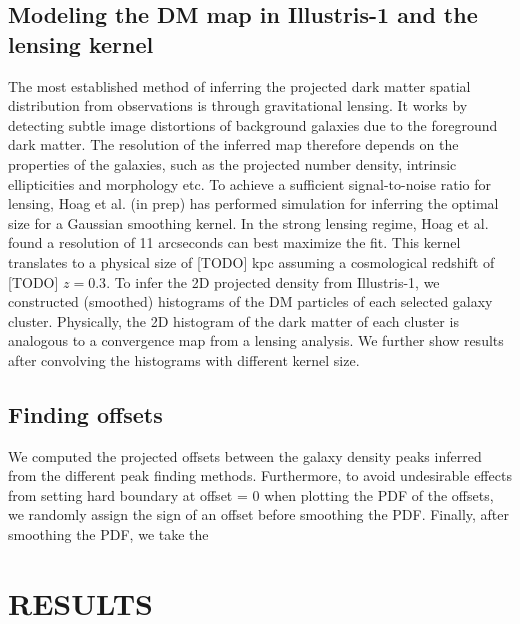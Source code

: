 \subsection{Modeling the DM map in Illustris-1 and the lensing kernel}
The most established method of inferring the projected dark matter spatial 
distribution from observations is through gravitational lensing.
It works by detecting subtle image distortions of background galaxies due to
the foreground dark matter. The resolution of the inferred map therefore 
depends on the properties of the galaxies, such as the projected number density, 
intrinsic ellipticities and morphology etc.
To achieve a sufficient signal-to-noise ratio for lensing, 
Hoag et al. (in prep) has performed simulation for inferring the optimal size
for a Gaussian smoothing kernel. 
In the strong lensing regime, Hoag et al. found a resolution of 11 arcseconds
can best maximize the fit. This kernel translates to a physical size of [TODO]
kpc assuming a cosmological redshift of [TODO] $z = 0.3$.
To infer the 2D projected density from Illustris-1, 
we constructed (smoothed) histograms of the DM
particles of each selected galaxy cluster. 
Physically, the 2D histogram of the dark matter of each cluster 
is analogous to a convergence map from a lensing analysis. 
We further show results after convolving the histograms with different kernel
size.   




\subsection{Finding offsets} 
We computed the projected offsets between the galaxy density peaks inferred
from the different peak finding methods. 
Furthermore, to avoid undesirable effects from setting hard boundary at offset
= 0 when plotting the PDF of the offsets, we randomly assign the sign of an
offset before smoothing the PDF. Finally, after smoothing the PDF, we take the







\section{RESULTS} 
\label{sec:results}



